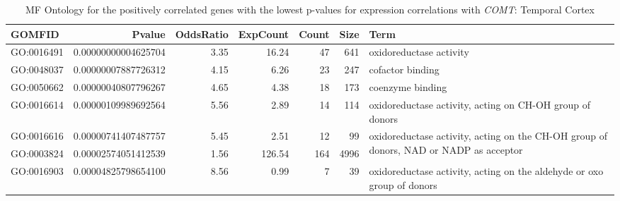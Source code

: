 \documentclass[letterpaper,12pt]{article}
\numberwithin{equation}{appendix}
\begin{document}
\noindent

\begin{landscape}

{\footnotesize {
\setlength\LTleft{-2.0cm}
\setlength\LTright{-2.0cm}
\begin{longtable}{lrrrrrl}
\caption{MF Ontology for the positively correlated genes with the lowest p-values for expression correlations with {\textit {COMT}}: Temporal Cortex} \\ 
  \toprule
GOMFID & Pvalue & OddsRatio & ExpCount & Count & Size & Term \\ 
  \midrule
GO:0016491 & 0.00000000004625704 & 3.35 & 16.24 & 47 & 641 & oxidoreductase activity \\ 
  GO:0048037 & 0.00000007887726312 & 4.15 & 6.26 & 23 & 247 & cofactor binding \\ 
  GO:0050662 & 0.00000040807796267 & 4.65 & 4.38 & 18 & 173 & coenzyme binding \\ 
  GO:0016614 & 0.00000109989692564 & 5.56 & 2.89 & 14 & 114 & oxidoreductase activity, acting on CH-OH group of donors \\ 
  GO:0016616 & 0.00000741407487757 & 5.45 & 2.51 & 12 & 99 & \multirow{2}{10cm}[0.5em]{oxidoreductase activity, acting on the CH-OH group of donors, NAD or NADP as acceptor} \vspace{0.75em} \\ 
  GO:0003824 & 0.00002574051412539 & 1.56 & 126.54 & 164 & 4996 & catalytic activity \\ 
  GO:0016903 & 0.00004825798654100 & 8.56 & 0.99 & 7 & 39 & oxidoreductase activity, acting on the aldehyde or oxo group of donors \\ 
   \bottomrule
\end{longtable}
}}
\end{landscape}
\end{document}
